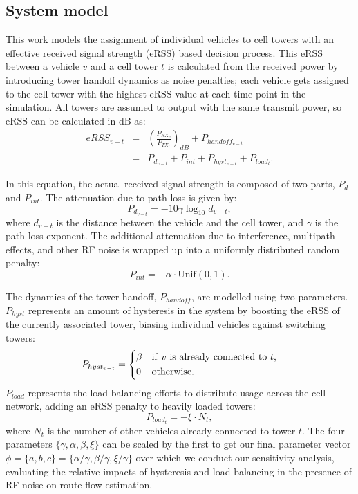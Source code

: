
\subsection{System model}
This work models the assignment of individual vehicles to cell towers with an effective received signal strength (eRSS) based decision process.  This eRSS between a vehicle $v$ and a cell tower $t$ is calculated from the received power by introducing tower handoff dynamics as noise penalties;
each vehicle gets assigned to the cell tower with the highest eRSS value at each time point in the simulation.
All towers are assumed to output with the same transmit power, so eRSS can be calculated in dB as: \begin{eqnarray}
  eRSS_{v-t} & = & \left( \frac{P_{RX_v}}{P_{TX_t}} \right)_{dB} 
                   + P_{handoff_{v-t}} \\
  & = & P_{d_{v-t}} +P_{int} + P_{hyst_{v-t}} + P_{load_t}.
\end{eqnarray}

In this equation, the actual received signal strength is composed of two parts, $P_d$ and $P_{int}$.  The attenuation due to path loss is given by: \begin{equation}
  P_{d_{v-t}} = -10 \gamma \log_{10} d_{v-t},
\end{equation}
where $d_{v-t}$ is the distance between the vehicle and the cell tower, and $\gamma$ is the path loss exponent.  The additional attenuation due to interference, multipath effects, and other RF noise is wrapped up into a uniformly distributed random penalty: \begin{equation}
  P_{int} = -\alpha \cdot \mathrm{Unif}(0,1).
\end{equation}

The dynamics of the tower handoff, $P_{handoff}$, are modelled using two parameters.  $P_{hyst}$ represents an amount of hysteresis in the system by boosting the eRSS of the currently associated tower, biasing individual vehicles against switching towers: \begin{equation}
  P_{hyst_{v-t}} = \begin{dcases}
    \beta & \mathrm{if~} v \mathrm{~is~already~connected~to~} t, \\
    0 & \mathrm{otherwise.}
  \end{dcases}
\end{equation}
$P_{load}$ represents the load balancing efforts to distribute usage across the cell network, adding an eRSS penalty to heavily loaded towers: \begin{equation}
  P_{load_t} = -\xi \cdot N_{t},
\end{equation}
where $N_t$ is the number of other vehicles already connected to tower $t$.  The four parameters $\{\gamma, \alpha, \beta, \xi\}$ can be scaled by the first to get our final parameter vector $\phi = \{a, b, c\} = \{\alpha/\gamma, \beta/\gamma, \xi/\gamma\}$ over which we conduct our sensitivity analysis, evaluating the relative impacts of hysteresis and load balancing in the presence of RF noise on route flow estimation.

